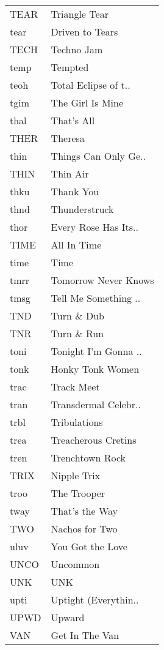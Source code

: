 \begin{supertabular}{ll}
 TEAR &         Triangle Tear \\
 tear &       Driven to Tears \\
 TECH &            Techno Jam \\
 temp &               Tempted \\
 teoh &  Total Eclipse of t.. \\
 tgim &      The Girl Is Mine \\
 thal &            That's All \\
 THER &               Theresa \\
 thin &  Things Can Only Ge.. \\
 THIN &              Thin Air \\
 thku &             Thank You \\
 thnd &         Thunderstruck \\
 thor &  Every Rose Has Its.. \\
 TIME &           All In Time \\
 time &                  Time \\
 tmrr &  Tomorrow Never Knows \\
 tmsg &  Tell Me Something .. \\
  TND &            Turn \& Dub \\
  TNR &            Turn \& Run \\
 toni &  Tonight I'm Gonna .. \\
 tonk &      Honky Tonk Women \\
 trac &            Track Meet \\
 tran &  Transdermal Celebr.. \\
 trbl &          Tribulations \\
 trea &   Treacherous Cretins \\
 tren &       Trenchtown Rock \\
 TRIX &           Nipple Trix \\
 troo &           The Trooper \\
 tway &        That's the Way \\
  TWO &        Nachos for Two \\
 uluv &      You Got the Love \\
 UNCO &              Uncommon \\
  UNK &                   UNK \\
 upti &  Uptight (Everythin.. \\
 UPWD &                Upward \\
  VAN &        Get In The Van \\

\end{supertabular}
